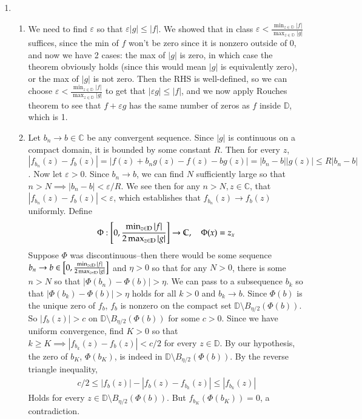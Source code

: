 \documentclass[12pt]{article}
\theoremstyle{definitionstyle}
\def\mbb#1{\mathbb{#1}}
\def \C{\mbb{C}}
\def \ve{\varepsilon}
\begin{document}
\begin{enumerate}[leftmargin=\labelsep]
		\item \begin{enumerate}
			\item We need to find $\ve$ so that $\ve |g| \leq |f|$. We showed that in class $\ve < \frac{\min_{z \in \mbb{D}} |f|}{\max_{z \in \mbb{D}} |g|}$ suffices, since the min of $f$ won't be zero since it is nonzero outside of $0$, and now we have 2 cases:
			the max of $|g|$ is zero, in which case the theorem obviously holds (since this would mean $|g|$ is equivalently zero), or the max of $|g|$ is not zero. Then the RHS is well-defined, so we can choose $\ve < \frac{\min_{z \in \mbb{D}} |f|}{\max_{z \in \mbb{D}} |g|}$ to get  that $|\ve g| \leq |f|$, and we now apply Rouches theorem to see that $f + \ve g$ has the same number of zeros as $f$ inside $\mbb{D}$, which is 1.
			
			\item Let $b_n \to b \in \C$ be any convergent sequence. Since $|g|$ is continuous on a compact domain, it is bounded by some constant $R$. Then for every $z$, $|f_{b_n}(z) - f_b(z)| = |f(z)+b_ng(z) - f(z) - bg(z)| = |b_n-b||g(z)| \leq R|b_n-b|$. Now let $\ve > 0$. Since $b_n \to b$, we can find $N$ sufficiently large so that $n > N \implies |b_n-b| < \ve/R$. We see then for any $n > N, z \in \C$, that $|f_{b_n}(z) - f_b(z)| < \ve$, which establishes that $f_{b_n}(z) \to f_b(z)$ uniformly. Define 
			\begin{align*}
				\Phi: \qty[0, \frac{\min_{z \in \mbb{D}} |f|}{2\max_{z \in \mbb{D}} |g|}] \to \C, \quad
				\Phi(x) = z_x
			\end{align*}
			Suppose $\Phi$ was discontinuous--then there would be some sequence $b_n \to b \in \qty[0, \frac{\min_{z \in \mbb{D}} |f|}{2\max_{z \in \mbb{D}} |g|}]$ and $\eta > 0$ so that for any $N > 0$, there is some $n > N$ so that $|\Phi(b_n)-\Phi(b)| > \eta$. We can pass to a subsequence $b_k$ so that $|\Phi(b_k)-\Phi(b)| > \eta$ holds for all $k > 0$ and $b_k \to b$. Since $\Phi(b)$ is the unique zero of $f_b$, $f_b$ is nonzero on the compact set $\mbb{D} \setminus B_{\eta/2}(\Phi(b))$. So $|f_b(z)| > c$ on $\mbb{D} \setminus B_{\eta/2}(\Phi(b))$ for some $c > 0$. Since we have uniform convergence, find $K > 0$ so that $k \geq K \implies |f_{b_k}(z) - f_b(z)| < c/2$ for every $z \in \mbb{D}$. By our hypothesis, the zero of $b_K$, $\Phi(b_K)$, is indeed in $\mbb{D} \setminus B_{\eta/2}(\Phi(b))$. By the reverse triangle inequality,
			\begin{align*}
				c/2 \leq |f_b(z)| - |f_b(z) - f_{b_k}(z)| \leq |f_{b_k}(z)|
			\end{align*}
			Holds for every $z \in \mbb{D} \setminus B_{\eta/2}(\Phi(b))$. But $f_{b_K}(\Phi(b_K)) = 0$, a contradiction.
		\end{enumerate}
	

\end{enumerate}
\end{document}
